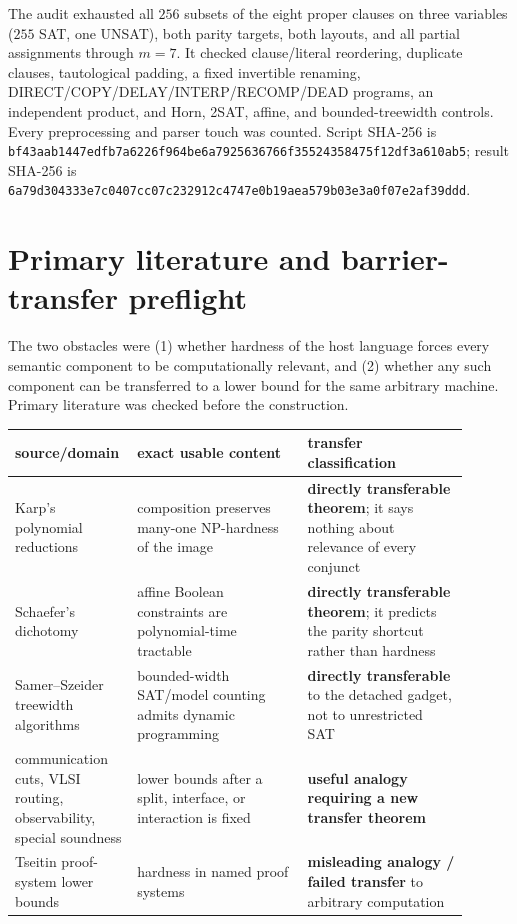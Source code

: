 \documentclass[11pt]{article}
\begin{document}
The audit exhausted all \(256\) subsets of the eight proper clauses on three
variables (\(255\) SAT, one UNSAT), both parity targets, both layouts, and
all partial assignments through \(m=7\).  It checked clause/literal
reordering, duplicate clauses, tautological padding, a fixed invertible
renaming, DIRECT/COPY/DELAY/INTERP/RECOMP/DEAD programs, an independent
product, and Horn, 2SAT, affine, and bounded-treewidth controls.  Every
preprocessing and parser touch was counted.  Script SHA-256 is
\nolinkurl{bf43aab1447edfb7a6226f964be6a7925636766f35524358475f12df3a610ab5};
result SHA-256 is
\nolinkurl{6a79d304333e7c0407cc07c232912c4747e0b19aea579b03e3a0f07e2af39ddd}.

\section{Primary literature and barrier-transfer preflight}

The two obstacles were (1) whether hardness of the host language forces every
semantic component to be computationally relevant, and (2) whether any such
component can be transferred to a lower bound for the same arbitrary machine.
Primary literature was checked before the construction.

\begin{longtable}{p{0.20\linewidth}p{0.36\linewidth}p{0.34\linewidth}}
\toprule
source/domain & exact usable content & transfer classification\\ \midrule
Karp's polynomial reductions & composition preserves many-one NP-hardness of
the image & \textbf{directly transferable theorem}; it says nothing about
relevance of every conjunct\\
Schaefer's dichotomy & affine Boolean constraints are polynomial-time
tractable & \textbf{directly transferable theorem}; it predicts the parity
shortcut rather than hardness\\
Samer--Szeider treewidth algorithms & bounded-width SAT/model counting admits
dynamic programming & \textbf{directly transferable} to the detached gadget,
not to unrestricted SAT\\
communication cuts, VLSI routing, observability, special soundness & lower
bounds after a split, interface, or interaction is fixed & \textbf{useful
analogy requiring a new transfer theorem}\\
Tseitin proof-system lower bounds & hardness in named proof systems &
\textbf{misleading analogy / failed transfer} to arbitrary computation\\
\bottomrule
\end{longtable}
\end{document}

